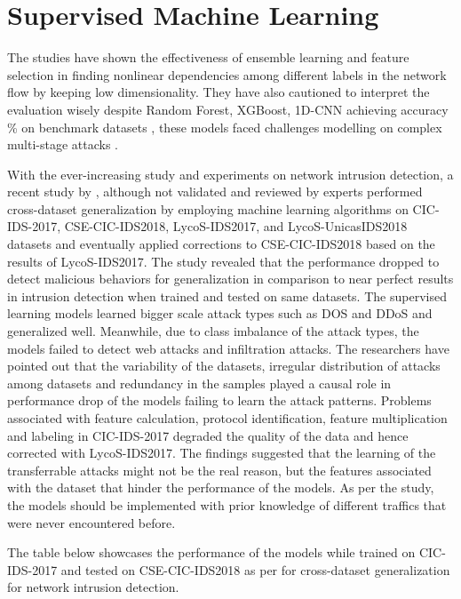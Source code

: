 \section{Supervised Machine Learning}

The studies have shown the effectiveness of ensemble learning and feature selection in finding nonlinear dependencies among different labels in the 
network flow by keeping low dimensionality. They have also cautioned to interpret the evaluation wisely despite Random Forest, XGBoost, 1D-CNN achieving 
accuracy \% on benchmark datasets \cite{Elangovan2026}, these models faced challenges modelling on complex multi-stage attacks \cite{Chandra2025}. 

With the ever-increasing study and experiments on network intrusion detection, a recent study by \cite{Cantone2024}, although not validated and reviewed
 by experts performed cross-dataset generalization by employing machine learning algorithms on CIC-IDS-2017, CSE-CIC-IDS2018, LycoS-IDS2017, 
 and LycoS-UnicasIDS2018 datasets and eventually applied corrections to CSE-CIC-IDS2018 based on the results of LycoS-IDS2017. The study revealed that the
  performance dropped to detect malicious behaviors for generalization in comparison to near perfect results in intrusion detection when trained and tested 
  on same datasets. The supervised learning models learned bigger scale attack types such as DOS and DDoS and generalized well. Meanwhile, due to class imbalance
   of the attack types, the models failed to detect web attacks and infiltration attacks. The researchers have pointed out that the variability of the datasets, 
   irregular distribution of attacks among datasets and redundancy in the samples played a causal role in performance drop of the models failing to learn the 
   attack patterns. Problems associated with feature calculation, protocol identification, feature multiplication and labeling in CIC-IDS-2017 degraded the 
   quality of the data and hence corrected with LycoS-IDS2017. The findings suggested that the learning of the transferrable attacks might not be the 
   real reason, but the features associated with the dataset that hinder the performance of the models. As per the study, the models should be implemented 
   with prior knowledge of different traffics that were never encountered before. 

The table below showcases the performance of the models while trained on CIC-IDS-2017 and tested on CSE-CIC-IDS2018 as per \cite{Cantone2024} for 
cross-dataset generalization for network intrusion detection.

